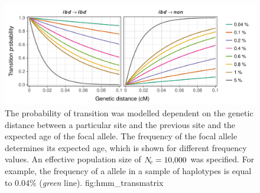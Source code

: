 

\begin{figure}[!htb]
\includegraphics[width=\textwidth]{./img/ch4/hmm_transmatrix}
{The probability of transition was modelled dependent on the genetic distance between a particular site and the previous site and the expected age of the focal allele.
The frequency of the focal allele determines its expected age, which is shown for different frequency values.
An effective population size of ${N_{\!e} = \num{10000}}$ was specified.
For example, the frequency of a  allele in a sample of  haplotypes is equal to 0.04\% (\emph{green} line).}
{fig:hmm_transmatrix}
\end{figure}
